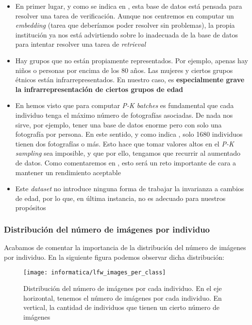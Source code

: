 \begin{itemize}
    \item En primer lugar, y como se indica en \cite{informatica:lfw_dataset}, esta base de datos está pensada para resolver una tarea de verificación. Aunque nos centremos en computar un \textit{embedding} (tarea que deberíamos poder resolver sin problemas), la propia institución ya nos está advirtiendo sobre lo inadecuada de la base de datos para intentar resolver una tarea de \textit{retrieval}
    \item Hay grupos que no están propiamente representados. Por ejemplo, apenas hay niños o personas por encima de los 80 años. Las mujeres y ciertos grupos étnicos están infrarrepresentados. En nuestro caso, es \textbf{especialmente grave la infrarrepresentación de ciertos grupos de edad}
    \item En  hemos visto que para computar \textit{P-K batches} es fundamental que cada individuo tenga el máximo número de fotografías asociadas. De nada nos sirve, por ejemplo, tener una base de datos enorme pero con solo una fotografía por persona. En este sentido, y como indica \cite{informatica:lfw_dataset}, solo 1680 individuos tienen dos fotografías o más. Esto hace que tomar valores altos en el \textit{P-K sampling} sea imposible, y que por ello, tengamos que recurrir al aumentado de datos. Como comentaremos en , esto será un reto importante de cara a mantener un rendimiento aceptable
    \item Este \textit{dataset} no introduce ninguna forma de trabajar la invarianza a cambios de edad, por lo que, en última instancia, no es adecuado para nuestros propósitos
\end{itemize}

\subsubsection{Distribución del número de imágenes por individuo}

Acabamos de comentar la importancia de la distribución del número de imágenes por individuo. En la siguiente figura podemos observar dicha distribución:

\begin{figure}[H]
    \centering
    \texttt{[image: informatica/lfw\_images\_per\_class]}
    \caption{Distribución del número de imágenes por cada individuo. En el eje horizontal, tenemos el número de imágenes por cada individuo. En vertical, la cantidad de individuos que tienen un cierto número de imágenes}
\end{figure}

